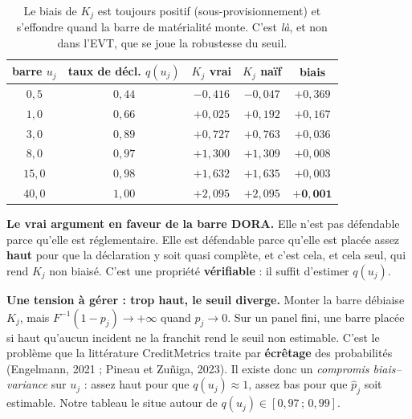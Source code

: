 \documentclass[11pt,a4paper]{article}
\begin{document}
\begin{table}[htbp]\centering\small
\renewcommand{\arraystretch}{1.2}
\begin{tabular}{@{}c c c c c@{}}
\toprule
\textbf{barre $u_j$} & \textbf{taux de décl. $q(u_j)$} & \textbf{$K_j$ vrai} & \textbf{$K_j$ naïf} & \textbf{biais} \\
\midrule
$0{,}5$ & $0{,}44$ & $-0{,}416$ & $-0{,}047$ & $+0{,}369$ \\
$1{,}0$ & $0{,}66$ & $+0{,}025$ & $+0{,}192$ & $+0{,}167$ \\
$3{,}0$ & $0{,}89$ & $+0{,}727$ & $+0{,}763$ & $+0{,}036$ \\
$8{,}0$ & $0{,}97$ & $+1{,}300$ & $+1{,}309$ & $+0{,}008$ \\
$15{,}0$ & $0{,}98$ & $+1{,}632$ & $+1{,}635$ & $+0{,}003$ \\
$40{,}0$ & $1{,}00$ & $+2{,}095$ & $+2{,}095$ & $\mathbf{+0{,}001}$ \\
\bottomrule
\end{tabular}
\caption{Le biais de $K_j$ est toujours positif (sous-provisionnement) et s'effondre quand
la barre de matérialité monte. C'est \emph{là}, et non dans l'EVT, que se joue la robustesse
du seuil.}
\end{table}

\begin{cle}
\textbf{Le vrai argument en faveur de la barre DORA.} Elle n'est pas défendable parce
qu'elle est \og{}réglementaire\fg{}. Elle est défendable parce qu'elle est placée assez
\textbf{haut} pour que la déclaration y soit quasi complète, et c'est cela, et cela seul, qui
rend $K_j$ non biaisé. C'est une propriété \textbf{vérifiable} : il suffit d'estimer
$q(u_j)$.
\end{cle}

\begin{attention}
\textbf{Une tension à gérer : trop haut, le seuil diverge.} Monter la barre débiaise $K_j$,
mais $F^{-1}(1-p_j) \to +\infty$ quand $p_j \to 0$. Sur un panel fini, une barre placée si
haut qu'aucun incident ne la franchit rend le seuil non estimable. C'est le problème que la
littérature CreditMetrics traite par \textbf{écrêtage} des probabilités
(Engelmann, 2021 ; Pineau et Zu\~niga, 2023). Il existe donc un \emph{compromis
biais--variance} sur $u_j$ : assez haut pour que $q(u_j)\approx 1$, assez bas pour que
$\hat p_j$ soit estimable. Notre tableau le situe autour de $q(u_j) \in [0{,}97\,;\,0{,}99]$.
\end{attention}
\end{document}
